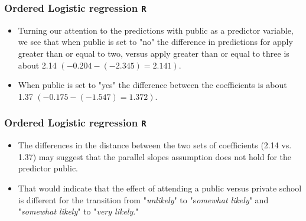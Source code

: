 \documentclass{beamer}
\begin{document}
\begin{frame}[fragile]
\frametitle{Ordered Logistic regression \texttt{R} }
\Large
\begin{itemize}
\item Turning our attention to the predictions with public as a predictor variable, we see that when public is set to "no" the difference in predictions for apply greater than or equal to two, versus apply greater than or equal to three is about 2.14 $(-0.204 - (-2.345) = 2.141)$. 
\item When public is set to "yes" the difference between the coefficients is about 1.37 $(-0.175 - (-1.547) = 1.372)$.
\end{itemize}
\end{frame}
\begin{frame}[fragile]
\frametitle{Ordered Logistic regression \texttt{R} }
\Large
\begin{itemize}
\item  The differences in the distance between the two sets of coefficients (2.14 vs. 1.37) may suggest that the parallel slopes assumption does not hold for the predictor public. 
\item That would indicate that the effect of attending a public versus private school is different for the transition from "\textit{unlikely}" to "s\textit{omewhat likely}" and "\textit{somewhat likely}" to "\textit{very likely}."
\end{itemize}
\end{frame}
	
\end{document}

